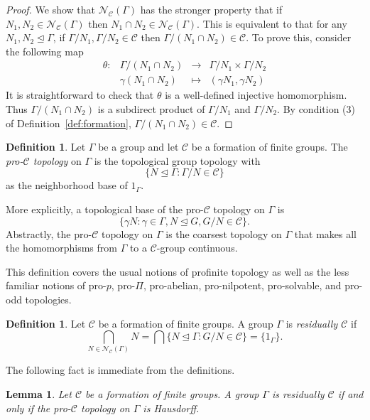 \documentclass[10pt,a4paper]{amsart}
\newtheorem{lemma}[theorem]{Lemma}
\theoremstyle{definition}
\newtheorem{definition}[theorem]{Definition}
\theoremstyle{definition}
\numberwithin{equation}{section}
\begin{document}
\begin{proof} We show that $\mathcal{N}_{\mathcal{C}}(\Gamma)$ has the stronger property that if $N_1, N_2\in \mathcal{N}_{\mathcal{C}}(\Gamma)$ then $N_1\cap N_2\in\mathcal{N}_{\mathcal{C}}(\Gamma)$. This is equivalent to that for any $N_1, N_2\unlhd \Gamma$, if $\Gamma/N_1, \Gamma/N_2\in\mathcal{C}$ then $\Gamma/(N_1\cap N_2)\in \mathcal{C}$. To prove this, consider the following map 
$$\begin{array}{rrcl} \theta\colon & \Gamma/(N_1\cap N_2)& \to & \Gamma/N_1\times\Gamma/N_2 \\
& \gamma(N_1\cap N_2) & \mapsto & (\gamma N_1, \gamma N_2) 
\end{array}
$$
It is straightforward to check that $\theta$ is a well-defined injective homomorphism. Thus $\Gamma/(N_1\cap N_2)$ is a subdirect product of $\Gamma/N_1$ and $\Gamma/N_2$. By condition (3) of Definition~\ref{def:formation}, $\Gamma/(N_1\cap N_2)\in \mathcal{C}$. 
\end{proof}

\begin{definition} Let $\Gamma$ be a group and let $\mathcal{C}$ be a formation of finite groups. The {\em pro-$\mathcal{C}$ topology} on $\Gamma$ is the topological group topology with
$$ \{ N\unlhd \Gamma\colon \Gamma/N\in\mathcal{C}\} $$
as the neighborhood base of $1_\Gamma$.
\end{definition}

More explicitly, a topological base of the pro-$\mathcal{C}$ topology on $\Gamma$ is
$$ \{ \gamma N\colon \gamma\in \Gamma, N\unlhd G, G/N\in\mathcal{C}\}. $$
Abstractly, the pro-$\mathcal{C}$ topology on $\Gamma$ is the coarsest topology on $\Gamma$ that makes all the homomorphisms from $\Gamma$ to a $\mathcal{C}$-group continuous. 

This definition covers the usual notions of profinite topology as well as the less familiar notions of pro-$p$, pro-$\Pi$, pro-abelian, pro-nilpotent, pro-solvable, and pro-odd topologies.

\begin{definition} Let $\mathcal{C}$ be a formation of finite groups. A group $\Gamma$ is {\em residually $\mathcal{C}$} if 
$$ \bigcap_{N\in\mathcal{N}_{\mathcal{C}}(\Gamma)}N=\bigcap\{N\unlhd \Gamma\colon G/N\in \mathcal{C}\}=\{1_\Gamma\}. $$
\end{definition}

The following fact is immediate from the definitions.

\begin{lemma} Let $\mathcal{C}$ be a formation of finite groups. A group $\Gamma$ is residually $\mathcal{C}$ if and only if the pro-$\mathcal{C}$ topology on $\Gamma$ is Hausdorff.
\end{lemma}
\end{document}
